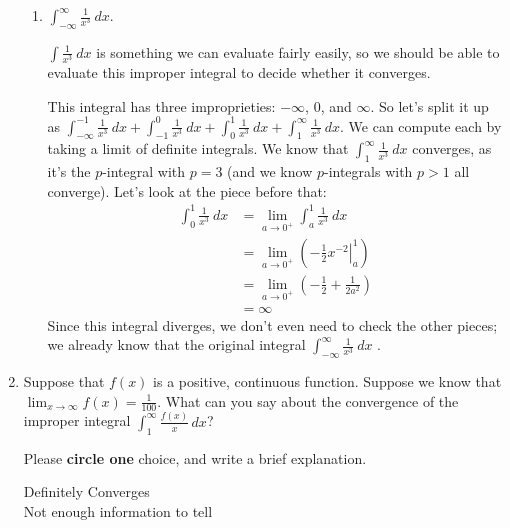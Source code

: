 \documentclass[main]{subfiles}
\begin{document}
\begin{enumerate}
\begin{enumerate}
\item 
\begin{problem}[\vfill]
$\displaystyle \int_{-\infty}^\infty \frac{1}{x^3}~dx$.
\end{problem}

\begin{solution}
$\displaystyle \int \frac{1}{x^3}~dx$ is something we can evaluate
fairly easily, so we should be able to evaluate this improper integral
to decide whether it converges.

This integral has three improprieties: $-\infty$, $0$, and $\infty$.
So let's split it up as $\displaystyle \int_{-\infty}^{-1}
\frac{1}{x^3}~dx + \int_{-1}^0 \frac{1}{x^3}~dx + \int_0^1
\frac{1}{x^3}~dx + \int_1^\infty \frac{1}{x^3}~dx$.  We can compute
each by taking a limit of definite integrals.  We know that
$\displaystyle \int_1^\infty \frac{1}{x^3}~dx$ converges, as it's the
$p$-integral with $p = 3$ (and we know $p$-integrals with $p > 1$ all
converge).  Let's look at the piece before that:
\begin{align*}
\int_0^1 \frac{1}{x^3}~dx & = \lim_{a \to 0^+} \int_a^1
\frac{1}{x^3}~dx \\
& = \lim_{a \to 0^+} \left( \left. - \frac{1}{2} x^{-2}
\right|_{a}^1 \right) \\
& = \lim_{a \to 0^+} \left( -\frac{1}{2} + \frac{1}{2 a^2} \right)
\\
& = \infty
\end{align*}
Since this integral diverges, we don't even need to check the other
pieces; we already know that the original integral $\displaystyle
\int_{-\infty}^\infty \frac{1}{x^3}~dx$ .
\end{solution}


\end{enumerate}
\pspace{\newpage}

 \item
		\begin{problem} Suppose that $f(x)$ is a positive, continuous function.  Suppose we know that $\displaystyle \lim_{x\rightarrow \infty} f(x) = \frac{1}{100}$.  
		What can you say about the convergence of the improper integral $\displaystyle \int_1^\infty \frac{f(x)}{x} \,dx$?\, 

 Please \textbf{circle one} choice, and write a brief explanation.\\

      \begin{multicols}{3}
        Definitely Converges\\
        Not enough information to tell
      \end{multicols}
		\end{problem}


\end{enumerate}
\end{document}
